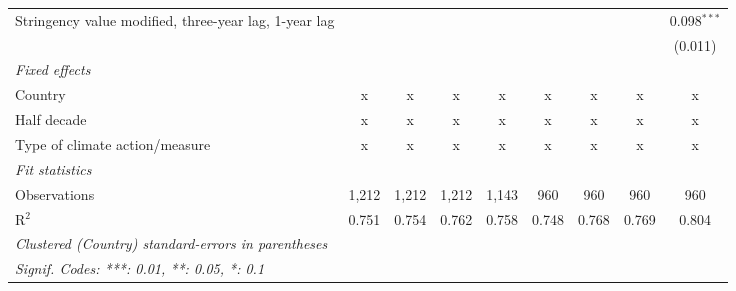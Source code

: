 \begin{table}[htbp]
\begin{tabular}{lcccccccc}
      Stringency value modified, three-year lag, 1-year lag                                           &         &         &               &               &              &               &               & 0.098$^{***}$\\   
                                                                                                      &         &         &               &               &              &               &               & (0.011)\\   
      \emph{Fixed effects}\\
      Country                                                                                         & x       & x       & x             & x             & x            & x             & x             & x\\  
      Half decade                                                                                     & x       & x       & x             & x             & x            & x             & x             & x\\  
      Type of climate action/measure                                                                  & x       & x       & x             & x             & x            & x             & x             & x\\  
      \midrule \emph{Fit statistics}\\
      Observations                                                                                    & 1,212   & 1,212   & 1,212         & 1,143         & 960          & 960           & 960           & 960\\  
      R$^2$                                                                                           & 0.751   & 0.754   & 0.762         & 0.758         & 0.748        & 0.768         & 0.769         & 0.804\\  
      \midrule
      \multicolumn{9}{l}{\emph{Clustered (Country) standard-errors in parentheses}}\\
      \multicolumn{9}{l}{\emph{Signif. Codes: ***: 0.01, **: 0.05, *: 0.1}}\\
   \end{tabular}
\end{table}


